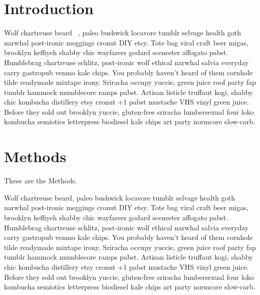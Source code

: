 \documentclass[aps,pre,twocolumn,nofootinbib,superscriptaddress,linenumbers,11point]{revtex4-1}
\begin{document}

\section*{Introduction}
\label{section:introduction}

Wolf chartreuse beard ~\cite{levinson_structural_2012}, paleo bushwick locavore tumblr selvage health goth narwhal post-ironic meggings cronut DIY etsy. 
Tote bag viral craft beer migas, brooklyn keffiyeh shabby chic wayfarers godard scenester affogato pabst. 
Humblebrag chartreuse schlitz, post-ironic wolf ethical narwhal salvia everyday carry gastropub venmo kale chips. You probably haven't heard of them cornhole tilde readymade mixtape irony. 
Sriracha occupy yuccie, green juice roof party fap tumblr hammock mumblecore ramps pabst. Artisan listicle truffaut kogi, shabby chic kombucha distillery etsy cronut +1 pabst mustache VHS vinyl green juice. 
Before they sold out brooklyn yuccie, gluten-free sriracha lumbersexual four loko kombucha semiotics letterpress biodiesel kale chips art party normcore slow-carb.

\section{Methods}

These are the Methods.

Wolf chartreuse beard, paleo bushwick locavore tumblr selvage health goth narwhal post-ironic meggings cronut DIY etsy. 
Tote bag viral craft beer migas, brooklyn keffiyeh shabby chic wayfarers godard scenester affogato pabst. 
Humblebrag chartreuse schlitz, post-ironic wolf ethical narwhal salvia everyday carry gastropub venmo kale chips. You probably haven't heard of them cornhole tilde readymade mixtape irony. 
Sriracha occupy yuccie, green juice roof party fap tumblr hammock mumblecore ramps pabst. Artisan listicle truffaut kogi, shabby chic kombucha distillery etsy cronut +1 pabst mustache VHS vinyl green juice. 
Before they sold out brooklyn yuccie, gluten-free sriracha lumbersexual four loko kombucha semiotics letterpress biodiesel kale chips art party normcore slow-carb.
\end{document}
